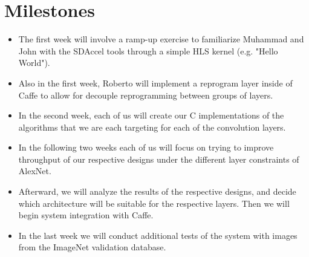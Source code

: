 \documentclass[conference,compsoc]{IEEEtran/IEEEtran}
\begin{document}
\section{Milestones}
\begin{itemize}
    \item The first week will involve a ramp-up exercise to familiarize Muhammad and John with the SDAccel tools through a simple HLS kernel (e.g. "Hello World"). 
    \item Also in the first week, Roberto will implement a reprogram layer inside of Caffe to allow for decouple reprogramming between groups of layers. 
    \item In the second week, each of us will create our C implementations of the algorithms that we are each targeting for each of the convolution layers.
    \item In the following two weeks each of us will focus on trying to improve throughput of our respective designs under the different layer constraints of AlexNet.
    \item Afterward, we will analyze the results of the respective designs, and decide which architecture will be suitable for the respective layers. Then we will begin system integration with Caffe.
    \item In the last week we will conduct additional tests of the system with images from the ImageNet validation database. 
\end{itemize}




\end{document}
